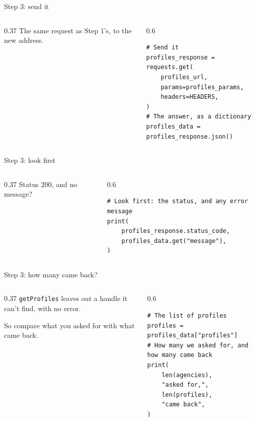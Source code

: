 \documentclass[9pt,aspectratio=169]{beamer}
\begin{document}
\begin{frame}[fragile]{Step 3: send it}
    \begin{columns}[T]
        \begin{column}{0.37\textwidth}
            The same request as Step 1's, to the new address.
        \end{column}
        \begin{column}{0.6\textwidth}
\begin{lstlisting}
# Send it
profiles_response = requests.get(
    profiles_url,
    params=profiles_params,
    headers=HEADERS,
)
# The answer, as a dictionary
profiles_data = profiles_response.json()
\end{lstlisting}
        \end{column}
    \end{columns}
\end{frame}

\begin{frame}[fragile]{Step 3: look first}
    \begin{columns}[T]
        \begin{column}{0.37\textwidth}
            Status 200, and no message?
        \end{column}
        \begin{column}{0.6\textwidth}
\begin{lstlisting}
# Look first: the status, and any error message
print(
    profiles_response.status_code,
    profiles_data.get("message"),
)
\end{lstlisting}
        \end{column}
    \end{columns}
\end{frame}

\begin{frame}[fragile]{Step 3: how many came back?}
    \begin{columns}[T]
        \begin{column}{0.37\textwidth}
            \texttt{getProfiles} leaves out a handle it can't find, with no error.

            \medskip
            So compare what you asked for with what came back.
        \end{column}
        \begin{column}{0.6\textwidth}
\begin{lstlisting}
# The list of profiles
profiles = profiles_data["profiles"]
# How many we asked for, and how many came back
print(
    len(agencies),
    "asked for,",
    len(profiles),
    "came back",
)
\end{lstlisting}
        \end{column}
    \end{columns}
\end{frame}
\end{document}
